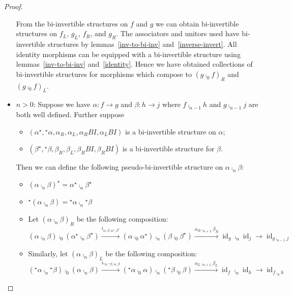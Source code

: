 \documentclass[draft]{article}
\theoremstyle{definition} \newtheorem{definition}{Definition}
\theoremstyle{remark} \newtheorem{remark}{Remark}
\DeclareMathOperator{\id}{id}
\newcommand{\linv}[1]{{}^\star\!#1} \newcommand{\rinv}[1]{#1^\star}
\begin{document}
\begin{proof}
\begin{itemize}
    From the bi-invertible structures on \(f\) and \(g\) we can obtain
    bi-invertible structures on \(f_L\), \(g_L\), \(f_R\), and
    \(g_R\). The associators and unitors used have bi-invertible
    structures by lemmas~\ref{inv-to-bi-inv} and~\ref{inverse-invert}.
    All identity morphisms can be equipped with a bi-invertible
    structure using lemmas~\ref{inv-to-bi-inv} and~\ref{identity}.
    Hence we have obtained collections of bi-invertible structures for
    morphisms which compose to \({(g \comp_0 f)}_R\) and \({(g \comp_0
      f)}_L\).
  \item \(n > 0\): Suppose we have \(\alpha: f \to g\) and \(\beta: h
    \to j\) where \(f \comp_{n-1} h\) and \(g \comp_{n-1} j\) are both
    well defined. Further suppose
    \begin{itemize}
    \item \((\rinv \alpha, \linv \alpha, \alpha_R, \alpha_L,
      \alpha_R{}BI, \alpha_L{}BI)\) is a bi-invertible structure on
      \(\alpha\);
    \item \((\rinv \beta, \linv \beta, \beta_R, \beta_L, \beta_R{}BI,
      \beta_R{}BI)\) is a bi-invertible structure for \(\beta\).
    \end{itemize}
    Then we can define the following pseudo-bi-invertible structure on
    \(\alpha \comp_n \beta\):
    \begin{itemize}
    \item \(\rinv {(\alpha \comp_n \beta)} = \rinv \alpha \comp_n
      \rinv \beta\)
    \item \(\linv {(\alpha \comp_n \beta)} = \linv \alpha \comp_n
      \linv \beta\)
    \item Let \({(\alpha \comp_n \beta)}_R\) be the following
      composition:
      \begin{equation*}
        (\alpha \comp_n \beta) \comp_0 (\rinv \alpha \comp_n \rinv \beta) \overset {i_{\alpha,\beta,\rinv \alpha, \rinv \beta}} \to (\alpha \comp_0 \rinv \alpha) \comp_n (\beta \comp_0 \rinv \beta) \overset {\alpha_R \comp_{n+1} \beta_R} \to \id_g \comp_n \id_j \to \id_{g \comp_{n-1} j}
      \end{equation*}
    \item Similarly, let \({(\alpha \comp_n \beta)}_L\) be the
      following composition:
      \begin{equation*}
        (\linv \alpha \comp_n \linv \beta) \comp_0 (\alpha \comp_n \beta) \overset {i_{\linv \alpha, \linv \beta, \alpha, \beta}} \to (\linv \alpha \comp_0 \alpha) \comp_n (\linv \beta \comp_0 \beta) \overset {\alpha _L \comp_{n+1} \beta _L} \to \id_f \comp_n \id_h \to \id_{f \comp_n h}

\end{equation*}
\end{itemize}
\end{itemize}
\end{proof}
\end{document}

